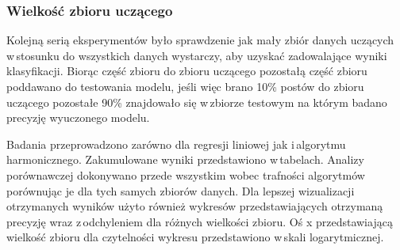 \subsubsection{Wielkość zbioru uczącego}
Kolejną serią eksperymentów było sprawdzenie jak mały zbiór danych uczących w\,stosunku do wszystkich danych wystarczy, aby uzyskać zadowalające wyniki klasyfikacji. Biorąc część zbioru do zbioru uczącego pozostałą część zbioru poddawano do testowania modelu, jeśli więc brano 10\% postów do zbioru uczącego pozostałe 90\% znajdowało się w\,zbiorze testowym na którym badano precyzję wyuczonego modelu.
 
Badania przeprowadzono zarówno dla regresji liniowej jak i\,algorytmu harmonicznego. Zakumulowane wyniki przedstawiono w\,tabelach. Analizy porównawczej dokonywano przede wszystkim wobec trafności algorytmów porównując je dla tych samych zbiorów danych. Dla lepszej wizualizacji otrzymanych wyników użyto również wykresów przedstawiających otrzymaną precyzję wraz z\,odchyleniem dla różnych wielkości zbioru. Oś x przedstawiającą wielkość zbioru dla czytelności wykresu przedstawiono w\,skali logarytmicznej. 

